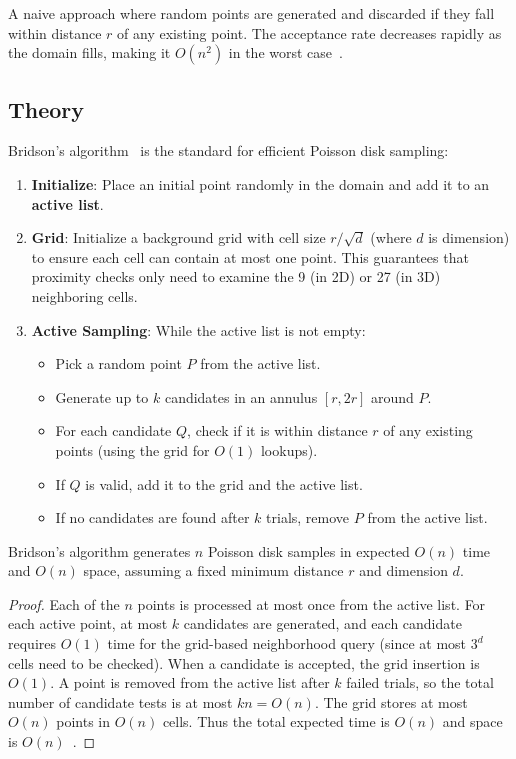 \begin{definition}\label{def:rejection_sampling}
A naive approach where random points are generated and discarded if they fall within distance $r$ of any existing point. The acceptance rate decreases rapidly as the domain fills, making it $O(n^2)$ in the worst case~\cite{lagae2008}.
\end{definition}

\subsection{Theory}
Bridson's algorithm~\cite{bridson2007} is the standard for efficient Poisson disk sampling:
\begin{enumerate}
    \item \textbf{Initialize}: Place an initial point randomly in the domain and add it to an \textbf{active list}.
    \item \textbf{Grid}: Initialize a background grid with cell size $r / \sqrt{d}$ (where $d$ is dimension) to ensure each cell can contain at most one point. This guarantees that proximity checks only need to examine the 9 (in 2D) or 27 (in 3D) neighboring cells.
    \item \textbf{Active Sampling}: While the active list is not empty:
    \begin{itemize}
        \item Pick a random point $P$ from the active list.
        \item Generate up to $k$ candidates in an annulus $[r, 2r]$ around $P$.
        \item For each candidate $Q$, check if it is within distance $r$ of any existing points (using the grid for $O(1)$ lookups).
        \item If $Q$ is valid, add it to the grid and the active list.
        \item If no candidates are found after $k$ trials, remove $P$ from the active list.
    \end{itemize}
\end{enumerate}

\begin{theorem}\label{thm:bridson_complexity}
Bridson's algorithm generates $n$ Poisson disk samples in expected $O(n)$ time and $O(n)$ space, assuming a fixed minimum distance $r$ and dimension $d$.
\end{theorem}

\begin{proof}
Each of the $n$ points is processed at most once from the active list. For each active point, at most $k$ candidates are generated, and each candidate requires $O(1)$ time for the grid-based neighborhood query (since at most $3^d$ cells need to be checked). When a candidate is accepted, the grid insertion is $O(1)$. A point is removed from the active list after $k$ failed trials, so the total number of candidate tests is at most $kn = O(n)$. The grid stores at most $O(n)$ points in $O(n)$ cells. Thus the total expected time is $O(n)$ and space is $O(n)$~\cite{bridson2007}.
\end{proof}

